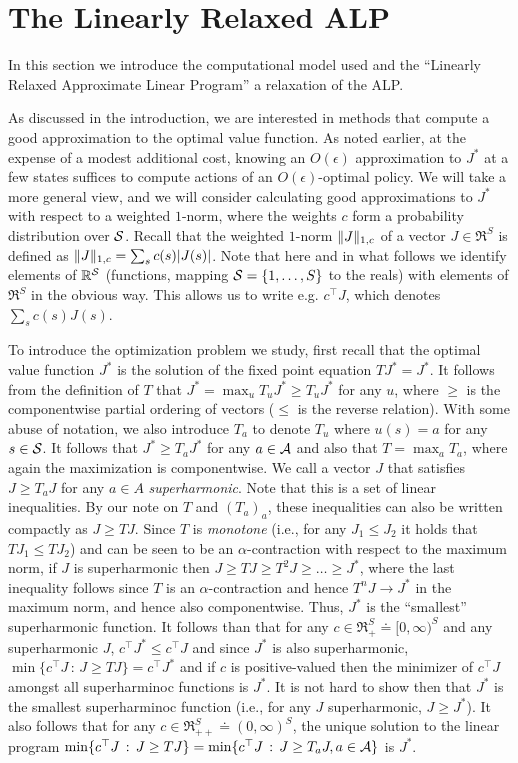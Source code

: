 \documentclass[12pt,draftcls,onecolumn]{IEEEtran}
\begin{document}
\section{The Linearly Relaxed ALP}\label{sec:grlp}
In this section we introduce the computational model used and the ``Linearly Relaxed Approximate Linear Program''
a relaxation of the ALP.

As discussed in the introduction, we are interested in methods that compute a good approximation to the optimal value function.
As noted earlier, at the expense of a modest additional cost, knowing an $O(\epsilon)$ approximation to $J^*$ at a few states suffices to compute actions of an $O(\epsilon)$-optimal policy. We will take a more general view, and we will consider calculating good approximations to $J^*$ with respect to a weighted $1$-norm, where the weights $c$ form a probability distribution over $\S$. Recall that the weighted $1$-norm $\norm{J}_{1,c}$ of a vector $J\in \Re^S$ is defined as $\norm{J}_{1,c}  = \sum_s c(s) |J(s)|$. Note that here and in what follows we identify elements of $\Re^\S$ (functions, mapping $\S = \{1,\dots,S\}$ to the reals) with elements of $\Re^S$ in the obvious way. This allows us to write e.g. $c^\top J$, which denotes $\sum_s c(s) J(s)$.

To introduce the optimization problem we study, first recall that
the optimal value function $J^*$ is the solution of the fixed point equation $TJ^* = J^*$.
It follows from the definition of $T$ that $J^* = \max_u T_u J^* \ge T_u J^*$ for any $u$,
where $\ge$ is the componentwise partial ordering of vectors ($\le$ is the reverse relation).
With some abuse of notation, we also introduce $T_a$ to denote $T_u$ where $u(s) = a$ for any $s\in \S$.
It follows that $J^* \ge T_a J^*$ for any $a\in \A$ and also that $T = \max_a T_a$, where again the maximization is componentwise.
We call a vector $J$ that satisfies $J \ge T_a J$ for any $a\in A$ \emph{superharmonic}. Note that this is a set of linear inequalities.
By our note on $T$ and $(T_a)_a$, these inequalities can also be written compactly as $J \ge T J$.
Since $T$ is \emph{monotone} (i.e., for any $J_1\le J_2$ it holds that $TJ_1 \le T J_2$) and can be seen to be an $\alpha$-contraction with respect to the maximum norm, if $J$ is superharmonic then $J \ge T J \ge T^2 J \ge \dots \ge J^*$, where the last inequality follows since $T$ is an $\alpha$-contraction and hence $T^n J \to J^*$ in the maximum norm, and hence also componentwise.
Thus, $J^*$ is the ``smallest'' superharmonic function. It follows than that
for any $c\in \Re_+^S \doteq [0,\infty)^S$ and any superharmonic $J$, $c^\top J^*\le c^\top J$ and since $J^*$ is also superharmonic, $\min \{ c^\top J\,:\, J \ge T J \} = c^\top J^*$ and if $c$ is positive-valued then the minimizer of $c^\top J$ amongst all superharminoc functions is $J^*$.
\fi
It is not hard to show then that $J^*$ is the smallest superharminoc function (i.e., for any $J$ superharmonic, $J\ge J^*$). It also follows that for any  $c\in \Re_{++}^S \doteq (0,\infty)^S$, the unique solution to the linear program $\min\{ c^\top J \,:\, J \ge T J \} =\min \{ c^\top J\,:\, J \ge T_a J, a\in \A \} $ is $J^*$.
\end{document}
